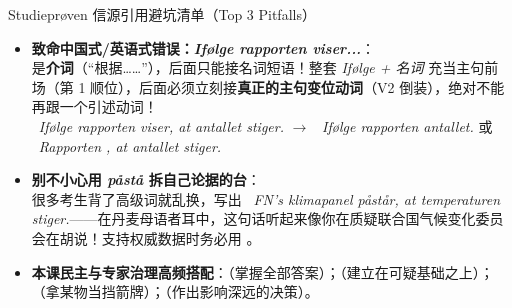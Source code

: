 \begin{grammatikbox}{Studieprøven 信源引用避坑清单（Top 3 Pitfalls）}
\begin{itemize}
  \item \textbf{ 致命中国式/英语式错误：\textit{Ifølge rapporten viser...}}：\\
     是\textbf{介词}（“根据……”），后面只能接名词短语！整套 \textit{Ifølge + 名词} 充当主句前场（第 1 顺位），后面必须立刻接\textbf{真正的主句变位动词}（V2 倒装），绝对不能再跟一个引述动词！\\
    \ \textit{Ifølge rapporten viser, at antallet stiger.} $\rightarrow$ \ \textit{Ifølge rapporten  antallet.} 或 \ \textit{Rapporten , at antallet stiger.}
  \item \textbf{ 别不小心用 \textit{påstå} 拆自己论据的台}：\\
    很多考生背了高级词就乱换，写出 \ \textit{FN's klimapanel påstår, at temperaturen stiger.}——在丹麦母语者耳中，这句话听起来像你在质疑联合国气候变化委员会在胡说！支持权威数据时务必用 。
  \item \textbf{ 本课民主与专家治理高频搭配}：（掌握全部答案）；（建立在可疑基础之上）；（拿某物当挡箭牌）；（作出影响深远的决策）。
\end{itemize}
\end{grammatikbox}



